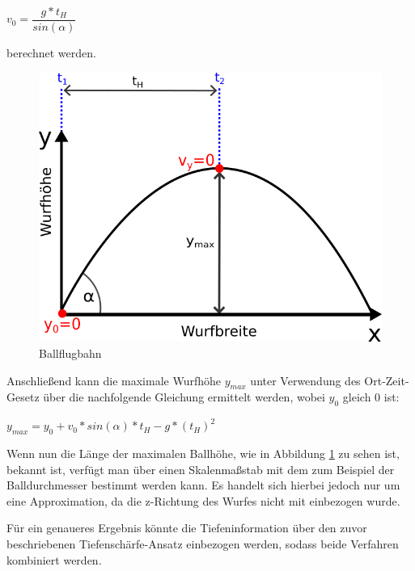 \documentclass{ezb}
\begin{document}
\begin{center}
	$v_0 = \dfrac{g * t_H}{sin(\alpha)}$
\end{center}
berechnet werden.
\begin{figure}[!h]
	\centering
	\includegraphics[scale=1.5]{./img/BallflugbahnAnsatz1.png}
	\caption{Ballflugbahn}
	\label{abb:ballflugbahn}
\end{figure}
Anschließend kann die maximale Wurfhöhe $y_{max}$ unter Verwendung des Ort-Zeit-Gesetz über die nachfolgende Gleichung ermittelt werden, wobei $y_0$ gleich 0 ist:
\begin{center}
$y_{max} = y_0 + v_0 * sin(\alpha) * t_H - g * (t_{H})^{2}$
\end{center}
Wenn nun die Länge der maximalen Ballhöhe, wie in Abbildung \ref{abb:ballflugbahn} zu sehen ist, bekannt ist, verfügt man über einen Skalenmaßstab mit dem zum Beispiel der Balldurchmesser bestimmt werden kann. Es handelt sich hierbei jedoch nur um eine Approximation, da die z-Richtung des Wurfes nicht mit einbezogen wurde. 

Für ein genaueres Ergebnis könnte die Tiefeninformation über den zuvor beschriebenen Tiefenschärfe-Ansatz einbezogen werden, sodass beide Verfahren kombiniert werden.
\end{document}
